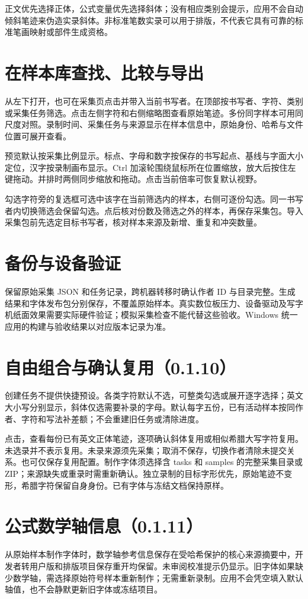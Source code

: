 正文优先选择正体，公式变量优先选择斜体；没有相应类别会提示，应用不会自动倾斜笔迹来伪造实录斜体。非标准笔数实录可以用于排版，不代表它具有可靠的标准笔画映射或部件生成资格。

\section{在样本库查找、比较与导出}
从左下打开，也可在采集页点击并带入当前书写者。在顶部按书写者、字符、类别或采集任务筛选。点击左侧字符和右侧缩略图查看原始笔迹。多份同字样本可用同尺度对照。录制时间、采集任务与来源显示在样本信息中，原始身份、哈希与文件位置可展开查看。

预览默认按采集比例显示。标点、字母和数字按保存的书写起点、基线与字面大小定位，汉字按录制画布显示。Ctrl 加滚轮围绕鼠标所在位置缩放，放大后按住左键拖动。并排时两侧同步缩放和拖动。点击当前倍率可恢复默认视野。

勾选字符旁的复选框可选中该字在当前筛选内的样本，右侧可逐份勾选。同一书写者内切换筛选会保留勾选。点后核对份数及筛选之外的样本，再保存采集包。导入采集包前先选定目标书写者，核对样本来源及新增、重复和冲突数量。

\section{备份与设备验证}
保留原始采集 JSON 和任务记录，跨机器转移时确认作者 ID 与目录完整。生成结果和字体发布包分别保存，不覆盖原始样本。真实数位板压力、设备驱动及写字机纸面效果需要实际硬件验证；模拟采集检查不能代替这些验收。Windows 统一应用的构建与验收结果以对应版本记录为准。

\section{自由组合与确认复用（0.1.10）}
创建任务不提供快捷预设。各类字符默认不选，可整类勾选或展开逐字选择；英文大小写分别显示，斜体仅选需要补录的字母。默认每字五份，已有活动样本按同作者、字符和写法补差额；不会重建旧任务或清除进度。

点击，查看每份已有英文正体笔迹，逐项确认斜体复用或相似希腊大写字符复用。未选录并不表示复用。未录来源须先采集；取消不保存，切换作者清除未提交关系。也可仅保存复用配置。制作字体须选择含 tasks 和 samples 的完整采集目录或 ZIP；来源缺失或重录时需重新确认。独立录制的目标字形优先，原始笔迹不变形，希腊字符保留自身身份。已有字体与冻结文档保持原样。

\section{公式数学轴信息（0.1.11）}
从原始样本制作字体时，数学轴参考信息保存在受哈希保护的核心来源摘要中，开发者转用户版和排版项目保存重开均保留。未审阅校准提示仍显示。旧字体如果缺少数学轴，需选择原始符号样本重新制作；无需重新录制。应用不会凭空填入默认轴值，也不会静默更新旧字体或冻结项目。
